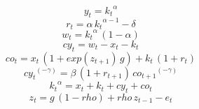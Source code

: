 \begin{dmath}
{y_{t}}={k_{t}}^{{\alpha}}
\end{dmath}
\begin{dmath}
{r_{t}}={\alpha}\, {k_{t}}^{{\alpha}-1}-{\delta}
\end{dmath}
\begin{dmath}
{w_{t}}={k_{t}}^{{\alpha}}\, \left(1-{\alpha}\right)
\end{dmath}
\begin{dmath}
{cy_{t}}={w_{t}}-{x_{t}}-{k_{t}}
\end{dmath}
\begin{dmath}
{co_{t}}={x_{t}}\, \left(1+exp\left({z_{t+1}}\right)\, {g}\right)+{k_{t}}\, \left(1+{r_{t}}\right)
\end{dmath}
\begin{dmath}
{cy_{t}}^{\left(-{\gamma}\right)}={\beta}\, \left(1+{r_{t+1}}\right)\, {co_{t+1}}^{\left(-{\gamma}\right)}
\end{dmath}
\begin{dmath}
{k_{t}}^{{\alpha}}={x_{t}}+{k_{t}}+{cy_{t}}+{co_{t}}
\end{dmath}
\begin{dmath}
{z_{t}}={g}\, \left(1-{rho}\right)+{rho}\, {z_{t-1}}-{e_{t}}
\end{dmath}
